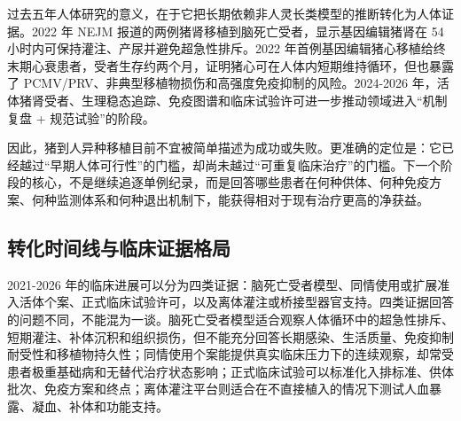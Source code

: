 \documentclass[
  chinese,
  11pt,a4paper]{article}
\begin{document}
过去五年人体研究的意义，在于它把长期依赖非人灵长类模型的推断转化为人体证据。2022
年 NEJM 报道的两例猪肾移植到脑死亡受者，显示基因编辑猪肾在 54
小时内可保持灌注、产尿并避免超急性排斥\citep{resultsoftwo2022}。2022
年首例基因编辑猪心移植给终末期心衰患者，受者生存约两个月，证明猪心可在人体内短期维持循环，但也暴露了
PCMV/PRV、非典型移植物损伤和高强度免疫抑制的风险\citep{griffith2022pigheartnejm, porcinecytomegalovirusin2022}。2024-2026
年，活体猪肾受者、生理稳态追踪、免疫图谱和临床试验许可进一步推动领域进入``机制复盘
+
规范试验''的阶段\citep{kawai2025porcinekidneynejm, physiologichomeostasisin2025, immuneprofilingin2026}。

因此，猪到人异种移植目前不宜被简单描述为成功或失败。更准确的定位是：它已经越过``早期人体可行性''的门槛，却尚未越过``可重复临床治疗''的门槛。下一个阶段的核心，不是继续追逐单例纪录，而是回答哪些患者在何种供体、何种免疫方案、何种监测体系和何种退出机制下，能获得相对于现有治疗更高的净获益。

\subsection{转化时间线与临床证据格局}\label{ux8f6cux5316ux65f6ux95f4ux7ebfux4e0eux4e34ux5e8aux8bc1ux636eux683cux5c40}

2021-2026
年的临床进展可以分为四类证据：脑死亡受者模型、同情使用或扩展准入活体个案、正式临床试验许可，以及离体灌注或桥接型器官支持。四类证据回答的问题不同，不能混为一谈。脑死亡受者模型适合观察人体循环中的超急性排斥、短期灌注、补体沉积和组织损伤，但不能充分回答长期感染、生活质量、免疫抑制耐受性和移植物持久性；同情使用个案能提供真实临床压力下的连续观察，却常受患者极重基础病和无替代治疗状态影响；正式临床试验可以标准化入排标准、供体批次、免疫方案和终点；离体灌注平台则适合在不直接植入的情况下测试人血暴露、凝血、补体和功能支持。
\end{document}
